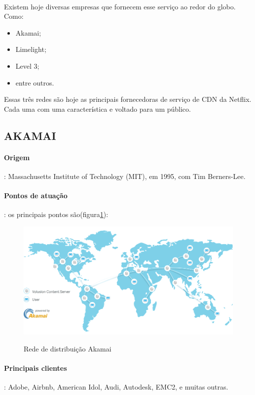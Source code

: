 \paragraph{}
Existem hoje diversas empresas que fornecem esse servi\c{c}o ao redor do globo. Como:
\begin{itemize}
\item Akamai;
\item Limelight;
\item Level 3;
\item entre outros.
\end{itemize}

Essas tr\^es redes s\~ao hoje as principais fornecedoras de servi\c{c}o de CDN da Netflix. Cada uma com uma caracter\'istica e voltado para um p\'ublico.
\subsection{AKAMAI}
\paragraph{Origem}: Massachusetts Institute of Technology (MIT), em 1995, com Tim Berners-Lee.
\paragraph{Pontos de atua\c{c}\~ao}: os principais pontos s\~ao(figura\ref{figura:akamai_map}):
\begin{figure}[H]
\caption{Rede de distribui\c{c}\~ao Akamai}
\includegraphics[width=14cm]{Figuras/akamai_map.png} 
\label{figura:akamai_map}
\end{figure}
\paragraph{Principais clientes}: Adobe, Airbnb, American Idol, Audi, Autodesk, EMC2, e muitas outras.
